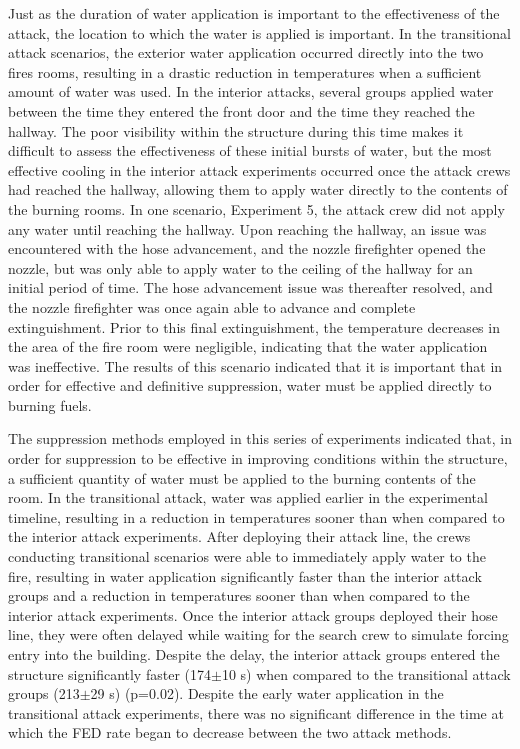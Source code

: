 \documentclass[12pt,oneside]{article}
\begin{document}
Just as the duration of water application is important to the effectiveness of the attack, the location to which the water is applied is important. In the transitional attack scenarios, the exterior water application occurred directly into the two fires rooms, resulting in a drastic reduction in temperatures when a sufficient amount of water was used. In the interior attacks, several groups applied water between the time they entered the front door and the time they reached the hallway. The poor visibility within the structure during this time makes it difficult to assess the effectiveness of these initial bursts of water, but the most effective cooling in the interior attack experiments occurred once the attack crews had reached the hallway, allowing them to apply water directly to the contents of the burning rooms. In one scenario, Experiment 5, the attack crew did not apply any water until reaching the hallway. Upon reaching the hallway, an issue was encountered with the hose advancement, and the nozzle firefighter opened the nozzle, but was only able to apply water to the ceiling of the hallway for an initial period of time. The hose advancement issue was thereafter resolved, and the nozzle firefighter was once again able to advance and complete extinguishment. Prior to this final extinguishment, the temperature decreases in the area of the fire room were negligible, indicating that the water application was ineffective. The results of this scenario indicated that it is important that in order for effective  and definitive suppression, water must be applied directly to burning fuels.

The suppression methods employed in this series of experiments indicated that, in order for suppression to be effective in improving conditions within the structure, a sufficient quantity of water must be applied to the burning contents of the room. In the transitional attack, water was applied earlier in the experimental timeline, resulting in a reduction in temperatures sooner than when compared to the interior attack experiments. After deploying their attack line, the crews conducting transitional scenarios were able to immediately apply water to the fire, resulting in water application significantly faster than the interior attack groups and a reduction in temperatures sooner than when compared to the interior attack experiments. Once the interior attack groups deployed their hose line, they were often delayed while waiting for the search crew to simulate forcing entry into the building. Despite the delay, the interior attack groups entered the structure significantly faster (174$\pm$10 s) when compared to the transitional attack groups (213$\pm$29 s) (p=0.02). Despite the early water application in the transitional attack experiments, there was no significant difference in the time at which the FED rate began to decrease between the two attack methods. 
\end{document}
